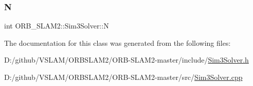 \subsubsection{\texorpdfstring{N}{N}}
{\footnotesize\ttfamily int O\+R\+B\+\_\+\+S\+L\+A\+M2\+::\+Sim3\+Solver\+::N\hspace{0.3cm}{\ttfamily [protected]}}



The documentation for this class was generated from the following files\+:\begin{DoxyCompactItemize}
\item 
D\+:/github/\+V\+S\+L\+A\+M/\+O\+R\+B\+S\+L\+A\+M2/\+O\+R\+B-\/\+S\+L\+A\+M2-\/master/include/\mbox{\hyperlink{_sim3_solver_8h}{Sim3\+Solver.\+h}}\item 
D\+:/github/\+V\+S\+L\+A\+M/\+O\+R\+B\+S\+L\+A\+M2/\+O\+R\+B-\/\+S\+L\+A\+M2-\/master/src/\mbox{\hyperlink{_sim3_solver_8cpp}{Sim3\+Solver.\+cpp}}\end{DoxyCompactItemize}
